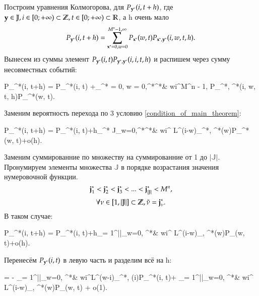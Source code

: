Построим уравнения Колмогорова, для \(P_{\bold{y}^*}(i, t + h)\), где \\
\(\bold{y} \in \mathbb{J}, i \in [0;+\infty) \subset \mathbb{Z}, t \in [0;+\infty) \subset \mathbb{R}\), а h очень мало
\[P_{\bold{y}^*}(i, t+h) = \sum_{\bold{x}^* = 0, w = 0}^{M^n - 1,\infty}P_{\bold{x}^*}(w, t)P_{\bold{x}^*, \bold{y}^*}(i, w, t, h).\]
Вынесем из суммы элемент \(P_{\bold{y}^*}(i, t)P_{\bold{y}^*, \bold{y}^*}(i, i, t, h)\) и распишем через сумму несовместных событий:
\begin{urv}{60} 
	P_{^*}(i, t+h) = \left[1 - \sum_{\bold{x}^* = 0, w = 0,\atop \bold{x}^*\neq \bold{y}^*\& w\neq i}^{M^n - 1,\infty}
	P_{\bold{y}^*, \bold{x}^*}(i, w, t, h)\right]P_{^*}(i, t)
	+\sum_{^* = 0, w = 0,\atop {}^*\neq {}^*\& w\neq i}^{M^n - 1,\infty}
	P_{^*, ^*}(i, w, t, h)P_{^*}(w, t).
\end{urv}
Заменим вероятность перехода по 3 условию \eqref{condition_of_main_theorem}:
\begin{urv}{60}
	P_{^*}(i, t+h) = \left[2 - h 
	\sum_{\bold{x}^* \in J}\sum_{w=0,\atop \bold{x}^*\neq \bold{y}^*\& w\neq i}^{\infty}
	L^{(w-i)}_{\bold{y}^*, \bold{x}^*}(i)\right]
	P_{^*}(i, t)+h\sum_{^* \in J}\sum_{w=0,\atop {}^*\neq {}^*\& w\neq i}^{\infty}
	L^{(i-w)}_{^*, ^*}(w)P_{^*}(w, t)+o(h).
\end{urv}
Заменим суммированние по множеству на суммированние от 1 до \(|\mathbb{J}|\).
Пронумируем элементы множества \(\mathbb{J}\) в порядке возрастания значения нумеровочной функции.
\[\bold{j}^*_1 < \bold{j}^*_2 < \bold{j}^*_3 <... < \bold{j}^*_{|\mathbb{J}|} < M^n,\]
\[\forall \nu \in [1, |\mathbb{J}|] \subset \mathbb{Z}, \tilde{\nu} = \bold{j}^*_{\nu}.\]
В таком случае:
\begin{urv}{60}
	P_{^*}(i, t+h) = \left[1 - h 
	\sum_{\nu = 1}^{|\mathbb{J}|}\sum_{w=0,\atop \tilde{\nu} \neq \bold{y}^*\& w\neq i}^{\infty}
	L^{(w-i)}_{ \bold{y}^*, \tilde{\nu}}(i)\right]
	P_{^*}(i, t)+h\sum_{\nu = 1}^{||}\sum_{w=0,\atop \tilde{\nu} \neq {}^*\& w\neq i}^{\infty}
	L^{(i-w)}_{\tilde{\nu}, ^*}(w)P_{\tilde{\nu}}(w, t)+o(h).
\end{urv}
Перенесём \(P_{\bold{y}^*}(i, t)\) в левую часть и разделим всё на h:
\begin{urv}{60}
	  =
	- \sum_{\nu = 1}^{||}\sum_{w=0,\atop \tilde{\nu} \neq {}^*\& w\neq i}^{\infty}L^{(w-i)}_{^*, \tilde{\nu}}(i)P_{^*}(i, t)+
	\sum_{\nu = 1}^{||}\sum_{w=0,\atop \tilde{\nu} \neq {}^*\& w\neq i}^{\infty}
	L^{(i-w)}_{\tilde{\nu}, ^*}(w)P_{\tilde{\nu}}(w, t) + o(1).
\end{urv}
